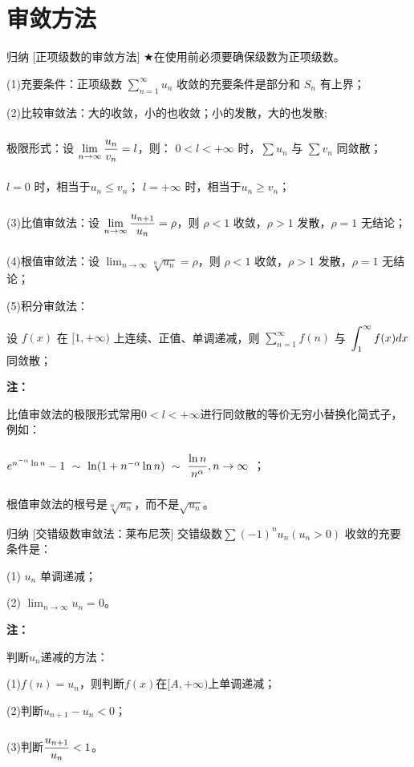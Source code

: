 \documentclass[a4paper,12pt,oneside,fontset=none]{ctexbook}
\renewcommand{\ge}{\geqslant}
\renewcommand{\le}{\leqslant}
\let\olddfrac\dfrac
\renewcommand{\dfrac}[2]{
    \olddfrac{#1\vrule width 0pt height 1.15em depth 0em}{#2\vrule width 0pt height 0em depth 0.6em}
}
\let\oldlim\lim
\renewcommand{\lim}{\displaystyle\oldlim}
\let\oldint\int
\renewcommand{\int}{\displaystyle{\vrule width 0pt height 0em depth 0em}\oldint}
\let\oldsum\sum
\renewcommand{\sum}{\displaystyle\oldsum}
\newenvironment{induction}[1][]{\begin{thmBox}{归纳}{#1}}{\end{thmBox}}
\newenvironment{note}{
    \par\vspace{0.5em}\noindent
    \textbf{\color{NoteColor} 注：}
}{
    \par\vspace{0.5em}
}
\numberwithin{equation}{chapter}
\begin{document}
\section{审敛方法}
\begin{induction}
    [正项级数的审敛方法]
    $\bigstar$在使用前必须要确保级数为正项级数。

    (1)充要条件：正项级数 $\sum_{n=1}^{\infty} u_n$ 收敛的充要条件是部分和 $S_n$ 有上界；
    
    (2)比较审敛法：大的收敛，小的也收敛；小的发散，大的也发散;
    
    极限形式：设 $\lim_{n \to \infty} \dfrac{u_n}{v_n} = l$，则：
    $0 < l < +\infty$ 时，$\sum u_n$ 与 $\sum v_n$ 同敛散；

    $l = 0$ 时，相当于$ u_n \le v_n$；
    $l = +\infty$ 时，相当于$ u_n \ge v_n$；

    (3)比值审敛法：设 $\lim_{n \to \infty} \dfrac{u_{n+1}}{u_n} = \rho $，则 $\rho < 1$ 收敛，$\rho > 1$ 发散，$\rho = 1$ 无结论；
    
    (4)根值审敛法：设 $\lim_{n \to \infty} \sqrt[n]{u_n} = \rho$，则 $\rho < 1$ 收敛，$\rho > 1$ 发散，$\rho = 1$ 无结论；
    
    (5)积分审敛法：
    
    设 $f(x)$ 在 $[1, +\infty)$ 上连续、正值、单调递减，则 $\sum_{n=1}^{\infty} f(n)$ 与 $\int_1^{\infty} f(x) dx$ 同敛散；
\end{induction}
\begin{note}
    比值审敛法的极限形式常用$0 < l < +\infty$进行同敛散的等价无穷小替换化简式子，例如：
    
    $e^{n^{-\alpha}\ln n}-1 ~\sim~ \ln (1 + n^{-\alpha}\ln n)~\sim~ \dfrac{\ln n}{n^{\alpha}}, n \to \infty$ ；
    
    根值审敛法的根号是$\sqrt[n]{u_n}$，而不是$\sqrt{u_n}。$
\end{note}

\begin{induction}
    [交错级数审敛法：莱布尼茨]
    交错级数$\sum(-1)^n u_n(u_n > 0)$ 收敛的充要条件是：

    (1) $ {u_n} $ 单调递减；
    
    (2) $\lim_{n \to \infty} u_n = 0$。
\end{induction}
\begin{note}
    判断$ {u_n} $递减的方法：
    
    (1)$f(n) = u_n$，则判断$f(x)$在$[A, +\infty)$上单调递减；

    (2)判断$u_{n+1} - u_n < 0$；
    
    (3)判断$\dfrac{u_{n+1}}{u_n} < 1$。
\end{note}
\end{document}
